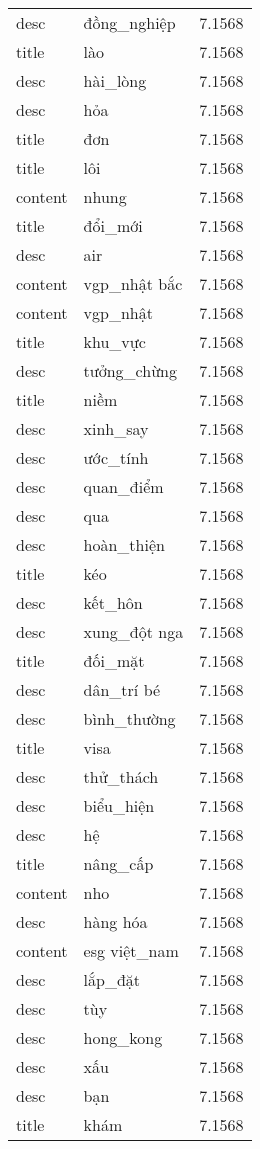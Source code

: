 \documentclass{article}
\begin{document}
\begin{tabular}{lll}
desc & đồng\_nghiệp & 7.1568\\
title & lào & 7.1568\\
desc & hài\_lòng & 7.1568\\
desc & hỏa & 7.1568\\
title & đơn & 7.1568\\
title & lôi & 7.1568\\
content & nhung & 7.1568\\
title & đổi\_mới & 7.1568\\
desc & air & 7.1568\\
content & vgp\_nhật bắc & 7.1568\\
content & vgp\_nhật & 7.1568\\
title & khu\_vực & 7.1568\\
desc & tưởng\_chừng & 7.1568\\
title & niềm & 7.1568\\
desc & xinh\_say & 7.1568\\
desc & ước\_tính & 7.1568\\
desc & quan\_điểm & 7.1568\\
desc & qua & 7.1568\\
desc & hoàn\_thiện & 7.1568\\
title & kéo & 7.1568\\
desc & kết\_hôn & 7.1568\\
desc & xung\_đột nga & 7.1568\\
title & đối\_mặt & 7.1568\\
desc & dân\_trí bé & 7.1568\\
desc & bình\_thường & 7.1568\\
title & visa & 7.1568\\
desc & thử\_thách & 7.1568\\
desc & biểu\_hiện & 7.1568\\
desc & hệ & 7.1568\\
title & nâng\_cấp & 7.1568\\
content & nho & 7.1568\\
desc & hàng hóa & 7.1568\\
content & esg việt\_nam & 7.1568\\
desc & lắp\_đặt & 7.1568\\
desc & tùy & 7.1568\\
desc & hong\_kong & 7.1568\\
desc & xấu & 7.1568\\
desc & bạn & 7.1568\\
title & khám & 7.1568\\

\end{tabular}
\end{document}

